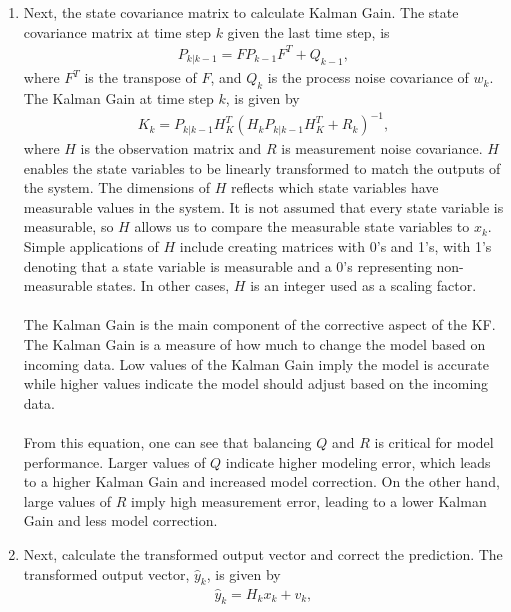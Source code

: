 \begin{enumerate}
  \item Next, the state covariance matrix to calculate Kalman Gain. The state covariance matrix at time step $k$ given the last time step, is 
    \begin{align*} 
        P_{k | k -1} = F P_{k - 1} F^T + Q_{k-1}, 
    \end{align*}
    where $F^T$ is the transpose of $F$, and $Q_{k}$ is the process noise covariance of $w_k$.
    The Kalman Gain at time step $k$, is given by
    \begin{align*} 
        K_k = P_{k | k - 1} H^T_K (H_k P_{k | k - 1} H^T_K + R_k)^{-1},
    \end{align*}
      where $H$ is the observation matrix and $R$ is measurement noise covariance. 
      $H$ enables the state variables to be linearly transformed to match the outputs of the system. The dimensions of $H$ reflects which state variables have measurable values in the system. It is not assumed that every state variable is measurable, so $H$ allows us to compare the measurable state variables to $x_k$. Simple applications of $H$ include creating matrices with 0's and 1's, with 1's denoting that a state variable is measurable and a 0's representing non-measurable states. In other cases, $H$ is an integer used as a scaling factor. \\ \\
     The Kalman Gain is the main component of the corrective aspect of the KF. The Kalman Gain is a measure of how much to change the model based on incoming data. Low values of the Kalman Gain imply the model is accurate while higher values indicate the model should adjust based on the incoming data.  \\ \\
     From this equation, one can see that balancing $Q$ and $R$ is critical for model performance. Larger values of $Q$ indicate higher modeling error, which leads to a higher Kalman Gain and increased model correction. On the other hand, large values of $R$ imply high measurement error, leading to a lower Kalman Gain and less model correction. 
     
   
    \item Next, calculate the transformed output vector and correct the prediction. The transformed output vector, $\hat y_k$, is given by
    \begin{align*}
        \hat y_k = H_k x_k + v_k,
    \end{align*}
    

\end{enumerate}
